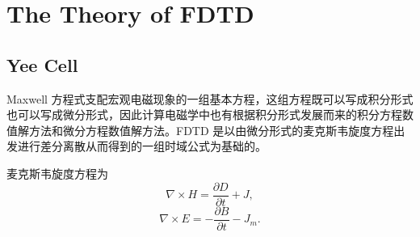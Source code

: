 
\chapter{The Theory of FDTD}
\section{Yee Cell}
Maxwell 方程式支配宏观电磁现象的一组基本方程，这组方程既可以写成积分形式也可以写成微分形式，因此计算电磁学中也有根据积分形式发展而来的积分方程数值解方法和微分方程数值解方法。FDTD 是以由微分形式的麦克斯韦旋度方程出发进行差分离散从而得到的一组时域公式为基础的。

麦克斯韦旋度方程为
\begin{equation}\label{maxwellH}
\nabla\times\mathbf{\mathit{H}}=\frac{\partial \mathbb{\mathit{D}}}{\partial t}+\mathbf{\mathit{J}},
\end{equation}
\begin{equation}\label{maxwellE}
\nabla\times\mathbf{\mathit{E}}=-\frac{\partial \mathbb{\mathit{B}}}{\partial t}-\mathbf{\mathit{J}}_m.
\end{equation}


